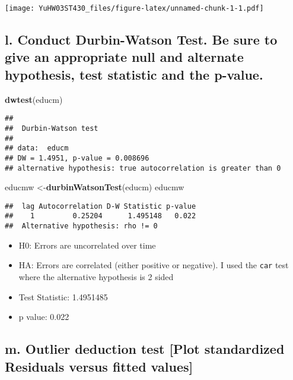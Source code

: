 \documentclass[
]{article}
\newenvironment{Shaded}{\begin{snugshade}}{\end{snugshade}}
\newcommand{\FunctionTok}[1]{\textcolor[rgb]{0.13,0.29,0.53}{\textbf{#1}}}
\newcommand{\NormalTok}[1]{#1}
\newcommand{\OtherTok}[1]{\textcolor[rgb]{0.56,0.35,0.01}{#1}}
\begin{document}
\texttt{[image: YuHW03ST430\_files/figure-latex/unnamed-chunk-1-1.pdf]}

\hypertarget{l.-conduct-durbin-watson-test.-be-sure-to-give-an-appropriate-null-and-alternate-hypothesis-test-statistic-and-the-p-value.}{%
\subsection{l. Conduct Durbin-Watson Test. Be sure to give an
appropriate null and alternate hypothesis, test statistic and the
p-value.}\label{l.-conduct-durbin-watson-test.-be-sure-to-give-an-appropriate-null-and-alternate-hypothesis-test-statistic-and-the-p-value.}}

\begin{Shaded}
\begin{Highlighting}[]
\FunctionTok{dwtest}\NormalTok{(educm)}
\end{Highlighting}
\end{Shaded}

\begin{verbatim}
## 
##  Durbin-Watson test
## 
## data:  educm
## DW = 1.4951, p-value = 0.008696
## alternative hypothesis: true autocorrelation is greater than 0
\end{verbatim}

\begin{Shaded}
\begin{Highlighting}[]
\NormalTok{educmw }\OtherTok{\textless{}{-}}\FunctionTok{durbinWatsonTest}\NormalTok{(educm)}
\NormalTok{educmw}
\end{Highlighting}
\end{Shaded}

\begin{verbatim}
##  lag Autocorrelation D-W Statistic p-value
##    1         0.25204      1.495148   0.022
##  Alternative hypothesis: rho != 0
\end{verbatim}

\begin{itemize}
\item
  H0: Errors are uncorrelated over time
\item
  HA: Errors are correlated (either positive or negative). I used the
  \texttt{car} test where the alternative hypothesis is 2 sided
\item
  Test Statistic: 1.4951485
\item
  p value: 0.022
\end{itemize}

\hypertarget{m.-outlier-deduction-test-plot-standardized-residuals-versus-fitted-values}{%
\subsection{m. Outlier deduction test {[}Plot standardized Residuals
versus fitted
values{]}}\label{m.-outlier-deduction-test-plot-standardized-residuals-versus-fitted-values}}
\end{document}
